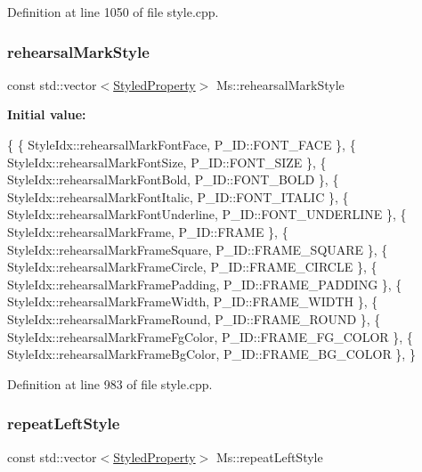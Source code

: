 Definition at line 1050 of file style.\+cpp.

\mbox{\label{namespace_ms_a19d9fda1b684c368827ecd575f5c95fc}} 
\subsubsection{\texorpdfstring{rehearsal\+Mark\+Style}{rehearsalMarkStyle}}
{\footnotesize\ttfamily const std\+::vector$<$\hyperlink{struct_ms_1_1_styled_property}{Styled\+Property}$>$ Ms\+::rehearsal\+Mark\+Style}

{\bfseries Initial value\+:}
\begin{DoxyCode}
\{
      \{ StyleIdx::rehearsalMarkFontFace,              P\_ID::FONT\_FACE              \},
      \{ StyleIdx::rehearsalMarkFontSize,              P\_ID::FONT\_SIZE              \},
      \{ StyleIdx::rehearsalMarkFontBold,              P\_ID::FONT\_BOLD              \},
      \{ StyleIdx::rehearsalMarkFontItalic,            P\_ID::FONT\_ITALIC            \},
      \{ StyleIdx::rehearsalMarkFontUnderline,         P\_ID::FONT\_UNDERLINE         \},
      \{ StyleIdx::rehearsalMarkFrame,                 P\_ID::FRAME                  \},
      \{ StyleIdx::rehearsalMarkFrameSquare,           P\_ID::FRAME\_SQUARE           \},
      \{ StyleIdx::rehearsalMarkFrameCircle,           P\_ID::FRAME\_CIRCLE           \},
      \{ StyleIdx::rehearsalMarkFramePadding,          P\_ID::FRAME\_PADDING          \},
      \{ StyleIdx::rehearsalMarkFrameWidth,            P\_ID::FRAME\_WIDTH            \},
      \{ StyleIdx::rehearsalMarkFrameRound,            P\_ID::FRAME\_ROUND            \},
      \{ StyleIdx::rehearsalMarkFrameFgColor,          P\_ID::FRAME\_FG\_COLOR         \},
      \{ StyleIdx::rehearsalMarkFrameBgColor,          P\_ID::FRAME\_BG\_COLOR         \},
      \}
\end{DoxyCode}


Definition at line 983 of file style.\+cpp.

\mbox{\label{namespace_ms_a390590b2518ed1bbebb5afda8192be50}} 
\subsubsection{\texorpdfstring{repeat\+Left\+Style}{repeatLeftStyle}}
{\footnotesize\ttfamily const std\+::vector$<$\hyperlink{struct_ms_1_1_styled_property}{Styled\+Property}$>$ Ms\+::repeat\+Left\+Style}

